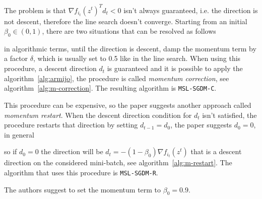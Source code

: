 The problem is that $\nabla f_{i_t}(z^t)^Td_t<0$ isn't always guaranteed, i.e. the direction is not descent, therefore the line search doesn't converge. Starting from an initial $\beta_0\in(0,1)$, there are two situations that can be resolved as follows
\begin{center}
\end{center}
in algorithmic terms, until the direction is descent, damp the momentum term by a factor $\delta$, which is usually set to \num{0.5} like in the line search. When using this procedure, a descent direction $d_t$ is guaranteed and it is possible to apply the algorithm~\ref{alg:armijo}, the procedure is called \emph{momentum correction}, see algorithm~\vref{alg:m-correction}. The resulting algorithm is \texttt{MSL-SGDM-C}.\par\smallskip

This procedure can be expensive, so the paper suggests another approach called \emph{momentum restart}. When the descent direction condition for $d_t$ isn't satisfied, the procedure restarts that direction by setting $d_{t-1}=d_0$, the paper suggests $d_0=0$, in general
\begin{center}
\end{center}
so if $d_0=0$ the direction will be $d_t=-(1-\beta_0)\nabla f_{i_t}(z^t)$ that is a descent direction on the considered mini-batch, see algorithm~\vref{alg:m-restart}. The algorithm that uses this procedure is \texttt{MSL-SGDM-R}.

The authors suggest to set the momentum term to $\beta_0=0.9$.
